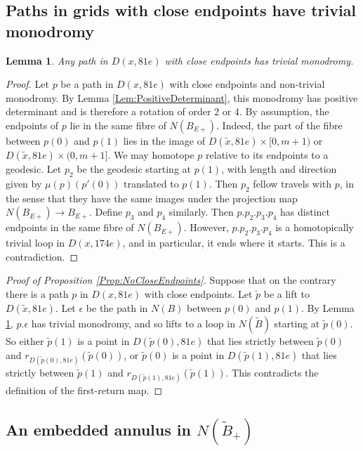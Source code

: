 \documentclass[oneside]{amsart}
\numberwithin{equation}{section}
\theoremstyle{plain}
\newtheorem{lemma}[equation]{Lemma}
\theoremstyle{definition}
\begin{document}
\subsection{Paths in grids with close endpoints have trivial monodromy}

\begin{lemma}
\label{Lem:TrivialMonodromy}
Any  path
in $D(x,81e)$ with close endpoints has trivial monodromy.
\end{lemma}

\begin{proof}
Let $p$ be a path in $D(x,81e)$ with close endpoints and non-trivial monodromy. 
By Lemma \ref{Lem:PositiveDeterminant}, this monodromy has positive determinant
and is therefore a rotation of order 2 or 4.
By assumption, the endpoints of $p$ lie in the same fibre
of $N(B_{E+})$. Indeed, the part of the fibre between $p(0)$ and $p(1)$ lies in the image of $D(\tilde x,81e) \times [0,m+1)$
or $D(\tilde x, 81e) \times (0,m+1]$.
We may homotope $p$ relative to its endpoints to a geodesic. Let $p_2$ be the geodesic starting at $p(1)$, with length
and direction given by $\mu(p) (p'(0))$ translated to $p(1)$. Then $p_2$ fellow travels with $p$, in the sense that
they have the same images under the projection map $N(B_{E+}) \rightarrow B_{E+}$.
Define $p_3$ and $p_4$ similarly.
Then $p.p_2.p_3.p_4$ has distinct endpoints in the same fibre of $N(B_{E+})$. However, $p.p_2.p_3.p_4$ is a homotopically
trivial loop in $D(x,174e)$, and in particular, it ends where it starts. This is a contradiction.
\end{proof}

\begin{proof}[Proof of Proposition \ref{Prop:NoCloseEndpoints}]
Suppose that on the contrary there is a path $p$ in $D(x,81e)$ with close endpoints. Let $\tilde p$ be a lift to $D(\tilde x, 81e)$.
Let $\epsilon$ be the path in $N(B)$
between $p(0)$ and $p(1)$. By Lemma \ref{Lem:TrivialMonodromy}, $p.\epsilon$ has trivial monodromy,
and so lifts to a loop in $N(\tilde B)$ starting at $\tilde p(0)$. So either $\tilde p(1)$ is a point in $D(\tilde p(0), 81e)$ that lies strictly between $\tilde p(0)$
and $r_{D(\tilde p(0),81e)}(\tilde p(0))$, or $\tilde p(0)$ is a point in $D(\tilde p(1), 81e)$ that lies strictly between $\tilde p(1)$
and $r_{D(\tilde p(1),81e)}(\tilde p(1))$. This contradicts the definition of the first-return map.
\end{proof}

\subsection{An embedded annulus in $N(\tilde B_+)$}
\label{Subsec:EmbeddedAnnulus}
\end{document}
